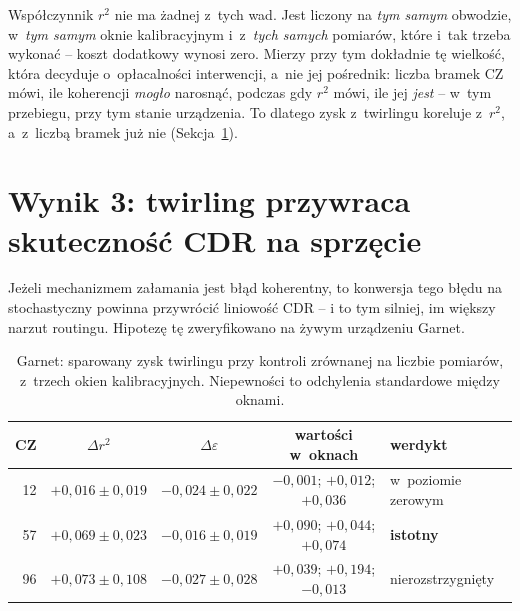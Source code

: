 \documentclass[11pt]{article}
\begin{document}
Współczynnik $r^2$ nie ma żadnej z~tych wad. Jest liczony na \emph{tym samym} obwodzie, w~\emph{tym
samym} oknie kalibracyjnym i~z~\emph{tych samych} pomiarów, które i~tak trzeba wykonać -- koszt
dodatkowy wynosi zero. Mierzy przy tym dokładnie tę wielkość, która decyduje o~opłacalności
interwencji, a~nie jej pośrednik: liczba bramek CZ mówi, ile koherencji \emph{mogło} narosnąć,
podczas gdy $r^2$ mówi, ile jej \emph{jest} -- w~tym przebiegu, przy tym stanie urządzenia. To
dlatego zysk z~twirlingu koreluje z~$r^2$, a~z~liczbą bramek już nie
(Sekcja~\ref{sec:twirl-wynik}).

\section{Wynik 3: twirling przywraca skuteczność CDR na sprzęcie}\label{sec:twirl-wynik}

Jeżeli mechanizmem załamania jest błąd koherentny, to konwersja tego błędu na stochastyczny powinna
przywrócić liniowość CDR -- i to tym silniej, im większy narzut routingu. Hipotezę tę zweryfikowano
na żywym urządzeniu Garnet.

\begin{table}[!ht]\centering
\caption{Garnet: sparowany zysk twirlingu przy kontroli zrównanej na liczbie pomiarów, z~trzech
okien kalibracyjnych. Niepewności to odchylenia standardowe między oknami.}
\label{tab:twirl}
\begin{tabular}{rcccl}
\toprule
CZ & $\Delta r^2$ & $\Delta \varepsilon$ & wartości w~oknach & werdykt \\
\midrule
12 & $+0{,}016 \pm 0{,}019$ & $-0{,}024 \pm 0{,}022$ & $-0{,}001$; $+0{,}012$; $+0{,}036$ & w~poziomie zerowym \\
57 & $+0{,}069 \pm 0{,}023$ & $-0{,}016 \pm 0{,}019$ & $+0{,}090$; $+0{,}044$; $+0{,}074$ & \textbf{istotny} \\
96 & $+0{,}073 \pm 0{,}108$ & $-0{,}027 \pm 0{,}028$ & $+0{,}039$; $+0{,}194$; $-0{,}013$ & nierozstrzygnięty \\
\bottomrule
\end{tabular}
\end{table}
\end{document}

